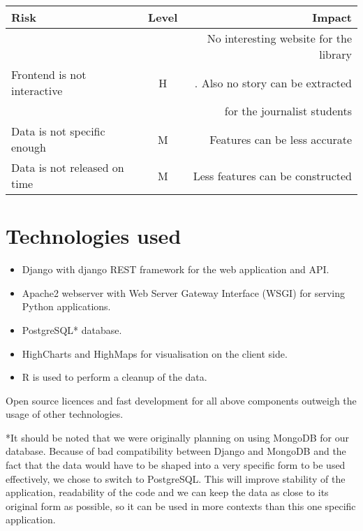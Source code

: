\begin{center}
  \begin{tabular}{ l | c | r  }
    \hline
    Risk & Level & Impact \\ \hline
   & & No interesting website for the library\\
      Frontend is not interactive & H & . Also no story can be extracted\\
    & &  for the journalist students \\
    Data is not specific enough & M & Features can be less accurate \\
    Data is not released on time & M & Less features can be constructed\\
  \end{tabular}
\end{center}

\section{Technologies used}

\begin{itemize}
	\item Django with django REST framework for the web application and API.
	\item Apache2 webserver with Web Server Gateway Interface (WSGI) for serving Python applications.
  \item PostgreSQL* database.
  \item HighCharts and HighMaps for visualisation on the client side.
  \item R is used to perform a cleanup of the data.
\end{itemize}

Open source licences and fast development for all above components outweigh the usage of other technologies.

*It should be noted that we were originally planning on using MongoDB for our database. Because of bad compatibility between Django and MongoDB and the fact that the data would have to be shaped into a very specific form to be used effectively, we chose to switch to PostgreSQL.
This will improve stability of the application, readability of the code and we can keep the data as close to its original form as possible, so it can be used in more contexts than this one specific application.

